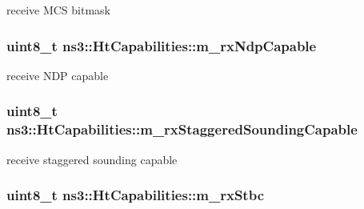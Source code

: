 receive M\+CS bitmask 

\subsubsection[{\texorpdfstring{m\+\_\+rx\+Ndp\+Capable}{m_rxNdpCapable}}]{\setlength{\rightskip}{0pt plus 5cm}uint8\+\_\+t ns3\+::\+Ht\+Capabilities\+::m\+\_\+rx\+Ndp\+Capable\hspace{0.3cm}{\ttfamily [private]}}\hypertarget{classns3_1_1HtCapabilities_a7039be4ac83036eb6b3fc100ee57fcc6}{}\label{classns3_1_1HtCapabilities_a7039be4ac83036eb6b3fc100ee57fcc6}


receive N\+DP capable 

\subsubsection[{\texorpdfstring{m\+\_\+rx\+Staggered\+Sounding\+Capable}{m_rxStaggeredSoundingCapable}}]{\setlength{\rightskip}{0pt plus 5cm}uint8\+\_\+t ns3\+::\+Ht\+Capabilities\+::m\+\_\+rx\+Staggered\+Sounding\+Capable\hspace{0.3cm}{\ttfamily [private]}}\hypertarget{classns3_1_1HtCapabilities_a2800a2c035cf78f10fc1bfb9869d8428}{}\label{classns3_1_1HtCapabilities_a2800a2c035cf78f10fc1bfb9869d8428}


receive staggered sounding capable 

\subsubsection[{\texorpdfstring{m\+\_\+rx\+Stbc}{m_rxStbc}}]{\setlength{\rightskip}{0pt plus 5cm}uint8\+\_\+t ns3\+::\+Ht\+Capabilities\+::m\+\_\+rx\+Stbc\hspace{0.3cm}{\ttfamily [private]}}\hypertarget{classns3_1_1HtCapabilities_afbb81f7ce7b03ece031333142eb68bdd}{}\label{classns3_1_1HtCapabilities_afbb81f7ce7b03ece031333142eb68bdd}


